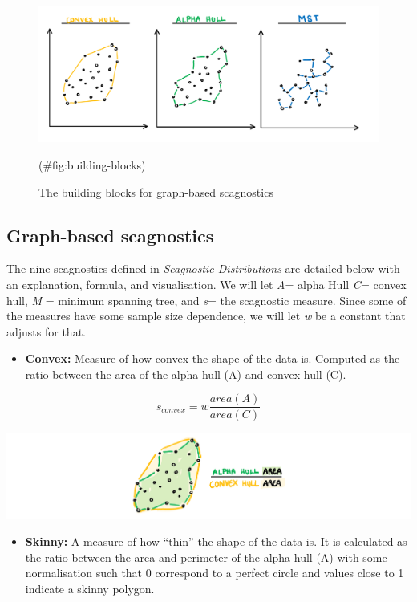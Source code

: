 \begin{Schunk}
\begin{figure}
\includegraphics[width=1\linewidth,height=0.3\textheight]{figures/draw1} \caption[The building blocks for graph-based scagnostics]{The building blocks for graph-based scagnostics}(\#fig:building-blocks)
\end{figure}
\end{Schunk}

\hypertarget{graph-based-scagnostics}{%
\subsection{Graph-based scagnostics}\label{graph-based-scagnostics}}

The nine scagnostics defined in \emph{Scagnostic Distributions} are
detailed below with an explanation, formula, and visualisation. We will
let \emph{A}= alpha Hull \emph{C}= convex hull, \emph{M} = minimum
spanning tree, and \emph{s}= the scagnostic measure. Since some of the
measures have some sample size dependence, we will let \emph{w} be a
constant that adjusts for that.

\begin{itemize}
\tightlist
\item
  \textbf{Convex:} Measure of how convex the shape of the data is.
  Computed as the ratio between the area of the alpha hull (A) and
  convex hull (C).
\end{itemize}

\[s_{convex}=w\frac{area(A)}{area(C)}\]

\includegraphics{figures/drawconvex.png}

\begin{itemize}
\tightlist
\item
  \textbf{Skinny:} A measure of how ``thin'' the shape of the data is.
  It is calculated as the ratio between the area and perimeter of the
  alpha hull (A) with some normalisation such that 0 correspond to a
  perfect circle and values close to 1 indicate a skinny polygon.
\end{itemize}

